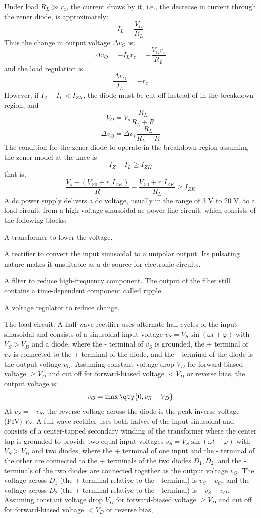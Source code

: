 \documentclass[a4paper,12pt]{report}
\begin{document}
Under load $R_L\gg r_z$, the current draws by it, i.e., the decrease in current through the zener diode, is approximately:
\[I_L=\frac{V_O}{R_L}\]
Thus the change in output voltage $\Delta v_O$ is:
\[\Delta v_O=-I_Lr_z=-\frac{V_Or_z}{R_L}\]
and the load regulation is
\[\frac{\Delta v_O}{I_L}=-r_z\]
However, if $I_Z-I_L<I_{ZK}$, the diode must be cut off instead of in the breakdown region, and
\[V_O=V_s\frac{R_L}{R_L+R}\]
\[\Delta v_O=\Delta v_s\frac{R_L}{R_L+R}\]
The condition for the zener diode to operate in the breakdown region assuming the zener model at the knee is
\[I_Z-I_L\ge I_{ZK}\]
that is,
\[\frac{V_s-(V_{Z0}+r_zI_{ZK})}{R}-\frac{V_{Z0}+r_zI_{ZK}}{R_L}\ge I_{ZK}\]
A dc power supply delivers a dc voltage, usually in the range of 3 V to 20 V, to a load circuit, from a high-voltage sinusoidal ac power-line circuit, which consists of the following blocks:
\ben
\item A transformer to lower the voltage.
\item A rectifier to convert the input sinusoidal to a unipolar output. Its pulsating nature makes it unsuitable as a dc source for electronic circuits.
\item A filter to reduce high-frequency component. The output of the filter still contains a time-dependent component called ripple.
\item A voltage regulator to reduce change.
\item The load circuit.
\een
{}
A half-wave rectifier uses alternate half-cycles of the input sinusoidal and consists of a sinusoidal input voltage $v_S=V_S\sin(\omega t+\varphi)$ with $V_S>V_D$ and a diode, where the - terminal of $v_S$ is grounded, the + terminal of $v_S$ is connected to the + terminal of the diode, and the - terminal of the diode is the output voltage $v_O$. Assuming constant voltage drop $V_D$ for forward-biased voltage $\ge V_D$ and cut off for forward-biased voltage $<V_D$ or reverse bias, the output voltage is:
\[v_O=\max\qty{0,v_S-V_D}\]
At $v_S=-v_S$, the reverse voltage across the diode is the peak inverse voltage (PIV) $V_S$.
A full-wave rectifier uses both halves of the input sinusoidal and consists of a center-tapped secondary winding of the transformer where the center tap is grounded to provide two equal input voltages $v_S=V_S\sin(\omega t+\varphi)$ with $V_S>V_D$ and two diodes, where the + terminal of one input and the - terminal of the other are connected to the + terminals of the two diodes $D_1,D_2$, and the - terminals of the two diodes are connected together as the output voltage $v_O$. The voltage across $D_1$ (the + terminal relative to the - terminal) is $v_S-v_O$, and the voltage across $D_2$ (the + terminal relative to the - terminal) is $-v_S-v_O$. Assuming constant voltage drop $V_D$ for forward-biased voltage $\ge V_D$ and cut off for forward-biased voltage $<V_D$ or reverse bias,
\end{document}
